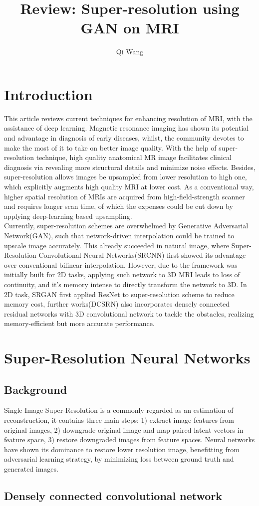 \documentclass{article}
\begin{document}
\title{Review: Super-resolution using GAN on MRI}
\author{Qi Wang}
\maketitle
\section{Introduction}
This article reviews current techniques for enhancing resolution of MRI, with the assistance of deep learning. Magnetic resonance imaging has shown its potential and advantage in diagnosis of early diseases, whilst, the community devotes to make the most of it to take on better image quality. With the help of super-resolution technique, high quality anatomical MR image facilitates clinical diagnosis via revealing more structural details and minimize noise effects. Besides, super-resolution allows images be upsampled from lower resolution to high one, which explicitly augments high quality MRI at lower cost. As a conventional way, higher spatial resolution of MRIs are acquired from high-field-strength scanner and requires longer scan time,  of which the expenses could be cut down by applying deep-learning based upsampling. \\

Currently, super-resolution schemes are overwhelmed by Generative Adversarial Network(GAN), such that network-driven interpolation could be trained to upscale image accurately. This already succeeded in natural image, where Super-
Resolution Convolutional Neural Networks(SRCNN) first showed its advantage over conventional bilinear interpolation. However, due to the framework was initially built for 2D tasks, applying such network to 3D MRI leads to loss of continuity, and it's memory intense to directly transform the network to 3D. In 2D task, SRGAN first applied ResNet to super-resolution scheme to reduce memory cost, further works(DCSRN) also incorporates densely connected residual networks with 3D convolutional network to tackle the obstacles, realizing memory-efficient but more accurate performance.  


\section{Super-Resolution Neural Networks}
\subsection{Background}
Single Image Super-Resolution is a commonly regarded as an estimation of reconstruction, it contains three main steps: 1) extract image features from original images, 2) downgrade original image and map paired latent vectors in feature space, 3) restore downgraded images from feature spaces. Neural networks have shown its dominance to restore lower resolution image, benefitting from adversarial learning strategy, by minimizing loss between ground truth and generated images. \\
\subsection{Densely connected convolutional network}
\end{document}
